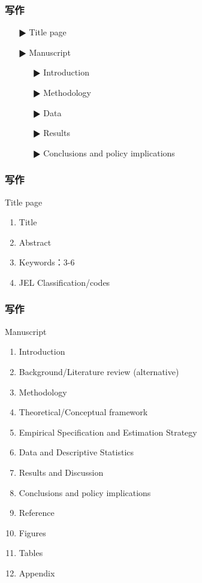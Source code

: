 \documentclass[11pt,mathserif]{beamer} %
\begin{document}
\begin{frame}
  \frametitle{写作}
  \begin{itemize}
    \item[$\RHD$] Title page
    \item[$\RHD$] Manuscript
    	\begin{itemize}
    		\item[$\RHD$] Introduction
    		\item[$\RHD$] Methodology
    		\item[$\RHD$] Data
    		\item[$\RHD$] Results
    		\item[$\RHD$] Conclusions and policy implications
    	\end{itemize}
  \end{itemize}
\end{frame}


\begin{frame}
  \frametitle{写作}
  \begin{block}{Title page}
    \begin{enumerate}
    	\item Title
    	\item Abstract
    	\item Keywords：3-6
    	\item JEL Classification/codes
    \end{enumerate}
  \end{block}
\end{frame}


\begin{frame}
  \frametitle{写作}
  \begin{block}{Manuscript}
    \begin{enumerate}
		\item Introduction
		\item Background/Literature review (alternative)
		\item Methodology
		\item Theoretical/Conceptual framework
		\item Empirical Specification and Estimation Strategy
		\item Data and Descriptive Statistics
		\item Results and Discussion
		\item Conclusions and policy implications
		\item Reference
		\item Figures
		\item Tables
		\item Appendix
    \end{enumerate}
  \end{block}
\end{frame}
\end{document}
